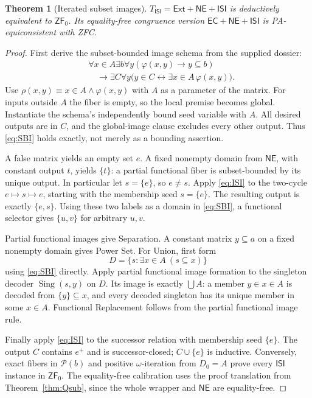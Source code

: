 \documentclass[11pt,letterpaper]{article}
\newtheorem{theorem}{Theorem}[section]
\theoremstyle{definition}\newtheorem{definition}[theorem]{Definition}
\theoremstyle{remark}\newtheorem{remark}[theorem]{Remark}
\newcommand{\ZFz}{\mathsf{ZF}_{0}}
\newcommand{\Ext}{\mathsf{Ext}}
\newcommand{\Pow}{\mathcal{P}}
\newcommand{\ISI}{\mathsf{ISI}}
\newcommand{\EC}{\mathsf{EC}}
\newcommand{\NE}{\mathsf{NE}}
\newcommand{\Sing}{\operatorname{Sing}}
\begin{document}
\begin{theorem}[Iterated subset images]\label{thm:ISI}
$T_{\ISI}=\Ext+\NE+\ISI$ is deductively equivalent to $\ZFz$.
Its equality-free congruence version $\EC+\NE+\ISI$ is PA-equiconsistent
with ZFC.
\end{theorem}
\begin{proof}
First derive the subset-bounded image schema from the supplied dossier:
\begin{equation}\label{eq:SBI}
\begin{split}
 &\forall x\in A\exists b\forall y
   (\varphi(x,y)\to y\subseteq b)\\
 &\hspace{1em}\longrightarrow\exists C\forall y
   \bigl(y\in C\leftrightarrow\exists x\in A\,\varphi(x,y)\bigr).
\end{split}
\end{equation}
Use $\rho(x,y)\equiv x\in A\land\varphi(x,y)$ with $A$ as a parameter
of the matrix. For inputs outside $A$ the fiber is empty, so the local
premise becomes global. Instantiate the schema's independently bound
seed variable with $A$. All desired outputs are in $C$, and the
global-image clause excludes every other output. Thus \eqref{eq:SBI}
holds exactly, not merely as a bounding assertion.

A false matrix yields an empty set $e$. A fixed nonempty domain from
$\NE$, with constant output $t$, yields $\{t\}$: a partial functional
fiber is subset-bounded by its unique output. In particular let
$s=\{e\}$, so $e\ne s$. Apply \eqref{eq:ISI} to the two-cycle
$e\mapsto s\mapsto e$, starting with the membership seed $s=\{e\}$.
The resulting output is exactly $\{e,s\}$.
Using these two labels as a domain in \eqref{eq:SBI}, a functional
selector gives $\{u,v\}$ for arbitrary $u,v$.

Partial functional images give Separation. A constant matrix
$y\subseteq a$ on a fixed nonempty domain gives Power Set.
For Union, first form
\[
 D=\{s:\exists x\in A\ (s\subseteq x)\}
\]
using \eqref{eq:SBI} directly. Apply partial functional image formation
to the singleton decoder $\Sing(s,y)$ on $D$. Its image is exactly
$\bigcup A$: a member $y\in x\in A$ is decoded from $\{y\}\subseteq x$,
and every decoded singleton has its unique member in some $x\in A$.
Functional Replacement follows from the partial functional image rule.

Finally apply \eqref{eq:ISI} to the successor relation with membership
seed $\{e\}$. The output $C$ contains $e^+$ and is successor-closed;
$C\cup\{e\}$ is inductive. Conversely, exact fibers in $\Pow(b)$ and
positive $\omega$-iteration from $D_0=A$ prove every $\ISI$ instance in
$\ZFz$. The equality-free calibration uses the proof translation from
Theorem~\ref{thm:Qsub}, since the whole wrapper and $\NE$ are equality-free.
\end{proof}
\end{document}

